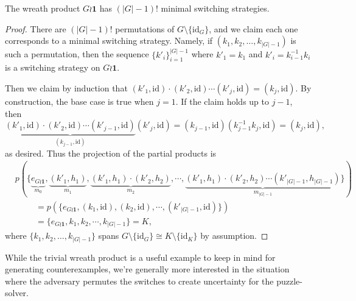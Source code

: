 \begin{proposition}
  The wreath product $G \wr \mathbf{1}$ has $(|G|-1)!$ minimal switching
  strategies.
  \label{prop:countingTrivialSS}
\end{proposition}
\begin{proof}
  There are $(|G| - 1)!$ permutations of $G \setminus \{\mathrm{id}_G\}$, and
  we claim each one corresponds to a minimal switching strategy. Namely,
  if $(k_1, k_2, \dots, k_{|G|-1})$ is such a permutation, then
  the sequence $\{k'_i\}_{i=1}^{|G|-1}$ where $k'_1 = k_1$ and
  $k'_i = k_{i-1}^{-1}k_i$ is a switching strategy on $G \wr \mathbf{1}$.

  Then we claim by induction that
  $(k'_1, \mathrm{id})\cdot(k'_2, \mathrm{id})\cdots(k'_j, \mathrm{id}) = (k_j, \mathrm{id})$.
  By construction, the base case is true when $j = 1$. If the claim holds up to
  $j-1$, then \begin{equation}
    \underbrace{
      (k'_1, \mathrm{id})\cdot(k'_2, \mathrm{id})\cdots(k'_{j-1}, \mathrm{id})
    }_{(k_{j-1}, \mathrm{id})}
    (k'_j, \mathrm{id})
    = (k_{j-1}, \mathrm{id})(k_{j-1}^{-1}k_j, \mathrm{id})
    = (k_j, \mathrm{id}),
  \end{equation} as desired.
  Thus the projection of the partial products is
  \begin{align}
    &p(\{
      \underbrace{e_{G \wr \mathbf{1}}}_{m_0},
      \underbrace{(k'_1, h_1)}_{m_1},
      \underbrace{(k'_1, h_1)\cdot(k'_2, h_2)}_{m_2},
      \cdots,
      \underbrace{(k'_1, h_1)\cdot(k'_2, h_2)\cdots(k'_{|G|-1}, h_{|G|-1})}_{m_{|G|-1}}
    \}) \\
    & \hspace{1cm} =
    p(\{
      e_{G \wr \mathbf{1}},
      (k_1, \mathrm{id}),
      (k_2, \mathrm{id}),
      \cdots,
      (k'_{|G|-1}, \mathrm{id})
    \}) \\
    & \hspace{1cm} = \{e_{G \wr \mathbf{1}}, k_1, k_2, \cdots,k_{|G|-1}\} = K,
  \end{align}
  where $\{k_1, k_2, \dots, k_{|G|-1}\}$ spans
  $G \setminus \{\mathrm{id}_G\} \cong K \setminus \{\mathrm{id}_K\}$ by
  assumption.
\end{proof}

While the trivial wreath product is a useful example to keep in mind for
generating counterexamples, we're generally more interested in the situation
where the adversary permutes the switches to create uncertainty for the
puzzle-solver.

